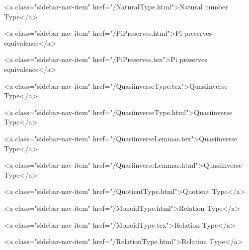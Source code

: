       
        
          <a class="sidebar-nav-item" href="/NaturalType.html">Natural number Type</a>
        
      
    
      
        
          <a class="sidebar-nav-item" href="/PiPreserves.html">Pi preserves equivalence</a>
        
      
    
      
        
          <a class="sidebar-nav-item" href="/PiPreserves.tex">Pi preserves equivalence</a>
        
      
    
      
        
          <a class="sidebar-nav-item" href="/QuasiinverseType.tex">Quasiinverse Type</a>
        
      
    
      
        
          <a class="sidebar-nav-item" href="/QuasiinverseType.html">Quasiinverse Type</a>
        
      
    
      
        
          <a class="sidebar-nav-item" href="/QuasiinverseLemmas.tex">Quasiinverse Type</a>
        
      
    
      
        
          <a class="sidebar-nav-item" href="/QuasiinverseLemmas.html">Quasiinverse Type</a>
        
      
    
      
        
          <a class="sidebar-nav-item" href="/QuotientType.html">Quotient Type</a>
        
      
    
      
        
          <a class="sidebar-nav-item" href="/MonoidType.html">Relation Type</a>
        
      
    
      
        
          <a class="sidebar-nav-item" href="/MonoidType.tex">Relation Type</a>
        
      
    
      
        
          <a class="sidebar-nav-item" href="/RelationType.html">Relation Type</a>
        
